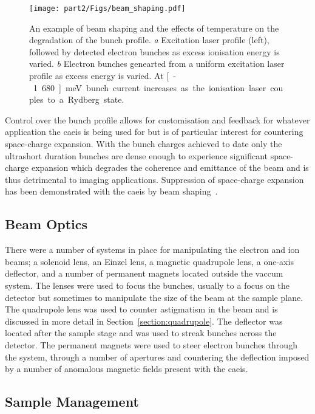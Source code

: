 \begin{figure}
    \center
    \texttt{[image: part2/Figs/beam\_shaping.pdf]}
    \caption{An example of beam shaping and the effects of temperature on the degradation of the bunch profile.
    \emph{a} Excitation laser profile (left), followed by detected electron bunches as excess ionisation energy is varied.
    \emph{b} Electron bunches genearted from a uniform excitation laser profile as excess energy is varied.
    At \unit[-1.680]{meV} bunch current increases as the ionisation laser couples to a Rydberg state.}
    \label{figure:beam_shaping}
\end{figure}

Control over the bunch profile allows for customisation and feedback for whatever application the \gls{caeis} is being used for but is of particular interest for countering space-charge expansion.
With the bunch charges achieved to date only the ultrashort duration bunches are dense enough to experience significant space-charge expansion which degrades the coherence and emittance of the beam and is thus detrimental to imaging applications.
Suppression of space-charge expansion has been demonstrated with the \gls{caeis} by beam shaping~\cite{luiten_how_2004,thompson_suppression_2016}.

\subsection{Beam Optics}

There were a number of systems in place for manipulating the electron and ion beams; a solenoid lens, an Einzel lens, a magnetic quadrupole lens, a one-axis deflector, and a number of permanent magnets located outside the vaccum system.
The lenses were used to focus the bunches, usually to a focus on the detector but sometimes to manipulate the size of the beam at the sample plane.
The quadrupole lens was used to counter astigmatism in the beam and is discussed in more detail in Section~\ref{section:quadrupole}.
The deflector was located after the sample stage and was used to streak bunches across the detector.
The permanent magnets were used to steer electron bunches through the system, through a number of apertures and countering the deflection imposed by a number of anomalous magnetic fields present with the \gls{caeis}.

\subsection{Sample Management}

